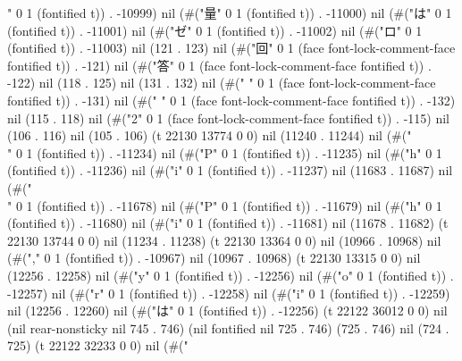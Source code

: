 " 0 1 (fontified t)) . -10999) nil (#("量" 0 1 (fontified t)) . -11000) nil (#("は" 0 1 (fontified t)) . -11001) nil (#("ゼ" 0 1 (fontified t)) . -11002) nil (#("ロ" 0 1 (fontified t)) . -11003) nil (121 . 123) nil (#("回" 0 1 (face font-lock-comment-face fontified t)) . -121) nil (#("答" 0 1 (face font-lock-comment-face fontified t)) . -122) nil (118 . 125) nil (131 . 132) nil (#(" " 0 1 (face font-lock-comment-face fontified t)) . -131) nil (#(" " 0 1 (face font-lock-comment-face fontified t)) . -132) nil (115 . 118) nil (#("2" 0 1 (face font-lock-comment-face fontified t)) . -115) nil (106 . 116) nil (105 . 106) (t 22130 13774 0 0) nil (11240 . 11244) nil (#("\\" 0 1 (fontified t)) . -11234) nil (#("P" 0 1 (fontified t)) . -11235) nil (#("h" 0 1 (fontified t)) . -11236) nil (#("i" 0 1 (fontified t)) . -11237) nil (11683 . 11687) nil (#("\\" 0 1 (fontified t)) . -11678) nil (#("P" 0 1 (fontified t)) . -11679) nil (#("h" 0 1 (fontified t)) . -11680) nil (#("i" 0 1 (fontified t)) . -11681) nil (11678 . 11682) (t 22130 13744 0 0) nil (11234 . 11238) (t 22130 13364 0 0) nil (10966 . 10968) nil (#("," 0 1 (fontified t)) . -10967) nil (10967 . 10968) (t 22130 13315 0 0) nil (12256 . 12258) nil (#("y" 0 1 (fontified t)) . -12256) nil (#("o" 0 1 (fontified t)) . -12257) nil (#("r" 0 1 (fontified t)) . -12258) nil (#("i" 0 1 (fontified t)) . -12259) nil (12256 . 12260) nil (#("は" 0 1 (fontified t)) . -12256) (t 22122 36012 0 0) nil (nil rear-nonsticky nil 745 . 746) (nil fontified nil 725 . 746) (725 . 746) nil (724 . 725) (t 22122 32233 0 0) nil (#("
